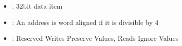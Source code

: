 \documentclass[letterpaper,10pt,english]{sphinxmanual}
\begin{document}
\begin{itemize}
\item {} 
\sphinxAtStartPar
{}: 32\sphinxhyphen{}bit data item

\item {} 
\sphinxAtStartPar
{}: An address is word aligned if it is divisible by 4

\item {} 
\sphinxAtStartPar
{}: Reserved Writes Preserve Values, Reads Ignore Values

\end{itemize}



\renewcommand{\indexname}{Index}
\printindex
\end{document}
